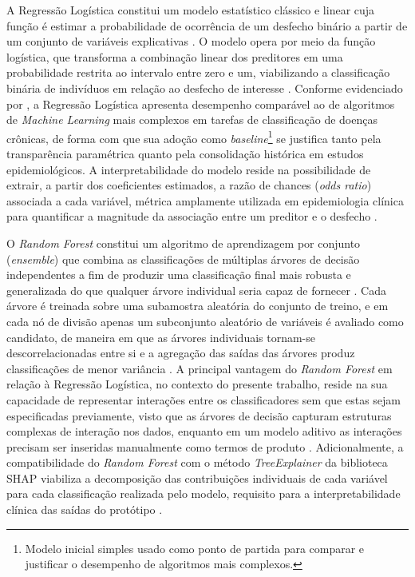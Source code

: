 A Regressão Logística constitui um modelo estatístico clássico e linear cuja função é estimar a probabilidade de ocorrência de um desfecho binário a partir de um conjunto de variáveis explicativas \cite{hastie2009elements}. O modelo opera por meio da função logística, que transforma a combinação linear dos preditores em uma probabilidade restrita ao intervalo entre zero e um, viabilizando a classificação binária de indivíduos em relação ao desfecho de interesse \cite{hastie2009elements}. Conforme evidenciado por \textcite{nusinovici2020logistic}, a Regressão Logística apresenta desempenho comparável ao de algoritmos de \textit{Machine Learning} mais complexos em tarefas de classificação de doenças crônicas, de forma com que sua adoção como \textit{baseline}\footnote{Modelo inicial simples usado como ponto de partida para comparar e justificar o desempenho de algoritmos mais complexos.} se justifica tanto pela transparência paramétrica quanto pela consolidação histórica em estudos epidemiológicos. A interpretabilidade do modelo reside na possibilidade de extrair, a partir dos coeficientes estimados, a razão de chances (\textit{odds ratio}) associada a cada variável, métrica amplamente utilizada em epidemiologia clínica para quantificar a magnitude da associação entre um preditor e o desfecho \cite{nusinovici2020logistic}.

O \textit{Random Forest} constitui um algoritmo de aprendizagem por conjunto (\textit{ensemble}) que combina as classificações de múltiplas árvores de decisão independentes a fim de produzir uma classificação final mais robusta e generalizada do que qualquer árvore individual seria capaz de fornecer \cite{hastie2009elements}. Cada árvore é treinada sobre uma subamostra aleatória do conjunto de treino, e em cada nó de divisão apenas um subconjunto aleatório de variáveis é avaliado como candidato, de maneira em que as árvores individuais tornam-se descorrelacionadas entre si e a agregação das saídas das árvores produz classificações de menor variância \cite{hastie2009elements}. A principal vantagem do \textit{Random Forest} em relação à Regressão Logística, no contexto do presente trabalho, reside na sua capacidade de representar interações entre os classificadores sem que estas sejam especificadas previamente, visto que as árvores de decisão capturam estruturas complexas de interação nos dados, enquanto em um modelo aditivo as interações precisam ser inseridas manualmente como termos de produto \cite{hastie2009elements}. Adicionalmente, a compatibilidade do \textit{Random Forest} com o método \textit{TreeExplainer} da biblioteca SHAP viabiliza a decomposição das contribuições individuais de cada variável para cada classificação realizada pelo modelo, requisito para a interpretabilidade clínica das saídas do protótipo \cite{salih2025perspective}.

